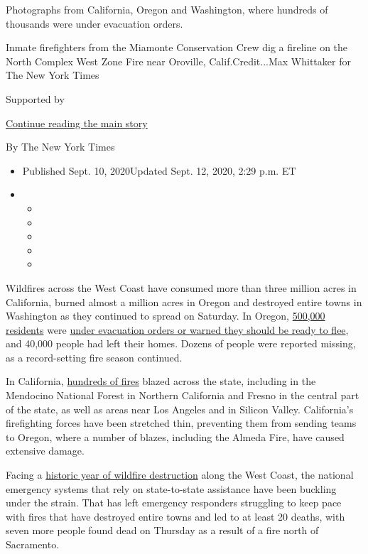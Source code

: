 Photographs from California, Oregon and Washington, where hundreds of
thousands were under evacuation orders.

Inmate firefighters from the Miamonte Conservation Crew dig a fireline
on the North Complex West Zone Fire near Oroville, Calif.Credit...Max
Whittaker for The New York Times

Supported by

\protect\hyperlink{after-sponsor}{Continue reading the main story}

By The New York Times

\begin{itemize}
\item
  Published Sept. 10, 2020Updated Sept. 12, 2020, 2:29 p.m. ET
\item
  \begin{itemize}
  \item
  \item
  \item
  \item
  \item
  \end{itemize}
\end{itemize}

Wildfires across the West Coast have consumed more than three million
acres in California, burned almost a million acres in Oregon and
destroyed entire towns in Washington as they continued to spread on
Saturday. In Oregon,
\href{https://www.nytimes3xbfgragh.onion/2020/09/11/us/wildfires-live-updates.html}{500,000
residents} were
\href{https://www.flashalert.net/id/OregonOfficeofEmergencyManagement}{under
evacuation orders or warned they should be ready to flee}, and 40,000
people had left their homes. Dozens of people were reported missing, as
a record-setting fire season continued.

In California,
\href{https://www.nytimes3xbfgragh.onion/interactive/2020/us/fires-map-tracker.html?action=click\&module=Top\%20Stories\&pgtype=Homepage}{hundreds
of fires} blazed across the state, including in the Mendocino National
Forest in Northern California and Fresno in the central part of the
state, as well as areas near Los Angeles and in Silicon Valley.
California's firefighting forces have been stretched thin, preventing
them from sending teams to Oregon, where a number of blazes, including
the Almeda Fire, have caused extensive damage.

Facing a
\href{https://www.nytimes3xbfgragh.onion/2020/09/10/us/climate-change-california-wildfires.html?action=click\&module=RelatedLinks\&pgtype=Article}{historic
year of wildfire destruction} along the West Coast, the national
emergency systems that rely on state-to-state assistance have been
buckling under the strain. That has left emergency responders struggling
to keep pace with fires that have destroyed entire towns and led to at
least 20 deaths, with seven more people found dead on Thursday as a
result of a fire north of Sacramento.

